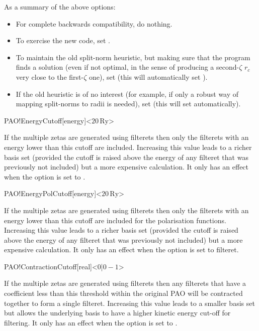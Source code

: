 As a summary of the above options:
\begin{itemize}
  \item%
  For complete backwards compatibility, do nothing.

  \item%
  To exercise the new code, set .
  
  \item%
  To maintain the old split-norm heuristic, but making sure that the
  program finds a solution (even if not optimal, in the sense of
  producing a second-$\zeta$ $r_c$ very close to the first-$\zeta$
  one), set  (this will automatically set
  ).
  
  \item%
  If the old heuristic is of no interest (for example, if only a
  robust way of mapping split-norms to radii is needed), set
   (this will set 
  automatically).

\end{itemize}

\begin{fdfentry}{PAO!EnergyCutoff}[energy]<$20\,\mathrm{Ry}$>

  If the multiple zetas are generated using filterets then only the
  filterets with an energy lower than this cutoff are
  included. Increasing this value leads to a richer basis set
  (provided the cutoff is raised above the energy of any filteret that
  was previously not included) but a more expensive calculation.  It
  only has an effect when the option  is set to
  .
  
\end{fdfentry}

\begin{fdfentry}{PAO!EnergyPolCutoff}[energy]<$20\,\mathrm{Ry}$>

  If the multiple zetas are generated using filterets then only the
  filterets with an energy lower than this cutoff are included for the
  polarisation functions. Increasing this value leads to a richer
  basis set (provided the cutoff is raised above the energy of any
  filteret that was previously not included) but a more expensive
  calculation. It only has an effect when the option
   is set to filteret.

\end{fdfentry}

\begin{fdfentry}{PAO!ContractionCutoff}[real]<$0$|$0-1$>

  If the multiple zetas are generated using filterets then any
  filterets that have a coefficient less than this threshold within
  the original PAO will be contracted together to form a single
  filteret.  Increasing this value leads to a smaller basis set but
  allows the underlying basis to have a higher kinetic energy cut-off
  for filtering. It only has an effect when the option
   is set to .
  
\end{fdfentry}




